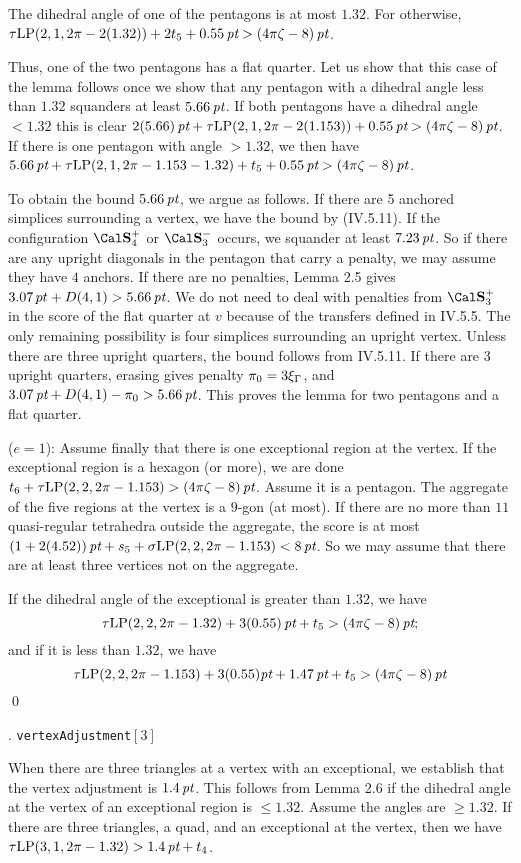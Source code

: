 The dihedral angle of one of 
the pentagons is at most $1.32$.  For otherwise, 
$\operatorname{\hbox{$\tau$}LP}(2,1,2\pi-2(1.32))+2t_5+0.55\,\hbox{\it pt}>(4\pi\zeta-8)\,\hbox{\it pt}$.

Thus, one of the two pentagons has a flat quarter.  Let us
show that this case of the lemma follows once we show that 
any pentagon with a dihedral angle less than $1.32$ 
squanders at least $5.66\,\hbox{\it pt}$.   If both pentagons have a dihedral
angle $<1.32$ this is clear 
$2(5.66)\,\hbox{\it pt}+\operatorname{\hbox{$\tau$}LP}(2,1,2\pi-2(1.153))+0.55\,\hbox{\it pt}>(4\pi\zeta-8)\,\hbox{\it pt}$.
If there is one pentagon with angle $>1.32$, 
we then have $5.66\,\hbox{\it pt}+\operatorname{\hbox{$\tau$}LP}(2,1,2\pi-1.153-1.32)+t_5+0.55\,\hbox{\it pt}>(4\pi\zeta-8)\,\hbox{\it pt}$.

To obtain the bound $5.66\,\hbox{\it pt}$, we argue as follows.  If
there are 5 anchored simplices surrounding a vertex, we have
the bound by (IV.5.11).  If the configuration $\Sfour$
or $\Sminus$ occurs, we squander at least $7.23\,\hbox{\it pt}$.
So if there are any upright diagonals in the pentagon
 that carry a penalty,
we may assume they have $4$ anchors.  If there are no
penalties, Lemma 2.5 gives
$3.07\,pt+D(4,1)>5.66\,\hbox{\it pt}$.
We do not need to deal with penalties from $\Splus$
in the score of the flat quarter at $v$ because of the
transfers defined in IV.5.5. 
The only remaining possibility is four simplices surrounding an
upright vertex.  Unless there are three upright quarters, the
bound follows from IV.5.11.  If there are 3 upright quarters,
erasing gives penalty $\pi_0=3\xi_\Gamma$, and
$3.07\,\hbox{\it pt} +D(4,1)-\pi_0 >5.66\,\hbox{\it pt}$.
This proves the lemma for two pentagons and a flat quarter.

($e=1$): Assume finally that there is one exceptional
region at the vertex.
If the exceptional region is a hexagon
(or more), we are done $t_6+\operatorname{\hbox{$\tau$}LP}(2,2,2\pi-1.153)>(4\pi\zeta-8)\,\hbox{\it pt}$.
Assume it is a pentagon.  The aggregate of the five regions at the
vertex is a $9$-gon (at most).  If there are no more than $11$
quasi-regular tetrahedra outside the aggregate, the score is
at most $(1+2(4.52))\,\hbox{\it pt}+s_5+\operatorname{\hbox{$\sigma$}LP}(2,2,2\pi-1.153)<8\,\hbox{\it pt}$.  So we may assume
that there are at least three vertices not on the aggregate.

If the dihedral angle of the exceptional is greater than $1.32$,
we have 
$$\operatorname{\hbox{$\tau$}LP}(2,2,2\pi-1.32) +3(0.55)\,\hbox{\it pt} +t_5 > (4\pi\zeta-8)\,\hbox{\it pt};$$ 
and if it is less than $1.32$, we have 
$$\operatorname{\hbox{$\tau$}LP}(2,2,2\pi-1.153)+3(0.55)\hbox{\it pt}+1.47\,\hbox{\it pt}+t_5> (4\pi\zeta-8)\,\hbox{\it pt}$$
\qed
\enddemo

. {\tt vertexAdjustment}$[3]$ \endsubhead

When there are three triangles at a vertex with an exceptional,
we establish that the vertex adjustment is $1.4\,\hbox{\it pt}$.
This follows from Lemma 2.6 if the dihedral angle at the
vertex of an exceptional region
is $\le1.32$.  Assume the angles are $\ge1.32$.
If there are three triangles, a quad, and an
exceptional at the vertex,
then we have $\operatorname{\hbox{$\tau$}LP}(3,1,2\pi-1.32)>1.4\,\hbox{\it pt}+t_4$.

